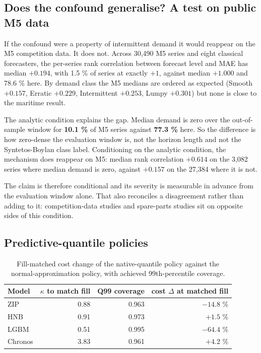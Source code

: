 \documentclass[11pt]{article}
\begin{document}
\subsection{Does the confound generalise? A test on public M5 data}

If the confound were a property of intermittent demand it would reappear on the
M5 competition data. It does not. Across 30{,}490 M5 series and eight classical
forecasters, the per-series rank correlation between forecast level and MAE has
median $\mathbf{+0.194}$, with 1.5 \% of series at exactly $+1$, against median
$+1.000$ and 78.6 \% here. By demand class the M5 medians are ordered as
expected (Smooth $+0.157$, Erratic $+0.229$, Intermittent $+0.253$, Lumpy
$+0.301$) but none is close to the maritime result.

The analytic condition explains the gap. Median demand is zero over the
out-of-sample window for \textbf{10.1 \%} of M5 series against
\textbf{77.3 \%} here. So the difference is how zero-dense the evaluation window is, not the
horizon length and not the Syntetos-Boylan class label. Conditioning on the
analytic condition, the mechanism does reappear on M5: median rank correlation
$\mathbf{+0.614}$ on the 3{,}082 series where median demand is zero, against
$\mathbf{+0.157}$ on the 27{,}384 where it is not.

The claim is therefore conditional and its severity is measurable in advance
from the evaluation window alone. That also reconciles a disagreement rather
than adding to it: competition-data studies and spare-parts studies sit on
opposite sides of this condition.

\subsection{Predictive-quantile policies}

\begin{table}[htbp]
\centering
\caption{Fill-matched cost change of the native-quantile policy against the
normal-approximation policy, with achieved 99th-percentile coverage.}
\label{tab:fillmatched}
\begin{tabular}{lrrr}
\toprule
Model & $\kappa$ to match fill & Q99 coverage & cost $\Delta$ at matched fill \\
\midrule
ZIP     & 0.88 & 0.963 & $-14.8$ \% \\
HNB     & 0.91 & 0.973 & $+1.5$ \% \\
LGBM    & 0.51 & 0.995 & $-64.4$ \% \\
Chronos & 3.83 & 0.961 & $+4.2$ \% \\
\bottomrule
\end{tabular}
\end{table}
\end{document}
